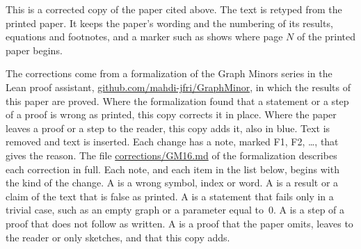 
This is a corrected copy of the paper cited above. The text is retyped from the printed paper.
It keeps the paper's wording and the numbering of its results, equations and footnotes, and a
marker such as  shows where page $N$ of the printed paper begins.

The corrections come from a formalization of the Graph Minors series in the Lean proof
assistant, \href{https://github.com/mahdi-jfri/GraphMinor}{github.com/mahdi-jfri/GraphMinor},
in which the results of this paper are proved. Where the formalization found that a statement
or a step of a proof is wrong as printed, this copy corrects it in place. Where the paper leaves a proof or a step to the reader, this
copy adds it, also in blue. Text  is removed and text  is inserted. Each change has a note, marked
\textcolor{fixcolor}{\sffamily F1}, \textcolor{fixcolor}{\sffamily F2}, \dots, that gives the
reason. The file
\href{https://github.com/mahdi-jfri/GraphMinor/blob/main/corrections/GM16.md}{corrections/GM16.md}
of the formalization describes each correction in full. Each note, and each item in the list below, begins with the kind of the change. A  is a wrong symbol, index or word. A  is a result or a claim of the text that is false as printed. A  is a statement that fails only in a trivial case, such as an empty graph or a parameter equal to~$0$. A  is a step of a proof that does not follow as written. A  is a proof that the paper omits, leaves to the reader or only sketches, and that this copy adds.

